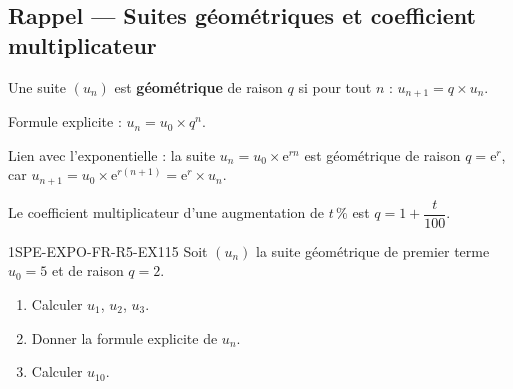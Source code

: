

\subsection*{Rappel — Suites géométriques et coefficient multiplicateur}

Une suite $(u_n)$ est \textbf{géométrique} de raison $q$ si pour tout $n$ : $u_{n+1} = q \times u_n$.

Formule explicite : $u_n = u_0 \times q^n$.

Lien avec l'exponentielle : la suite $u_n = u_0 \times \mathrm{e}^{rn}$ est géométrique de raison $q = \mathrm{e}^r$, car $u_{n+1} = u_0 \times \mathrm{e}^{r(n+1)} = \mathrm{e}^r \times u_n$.

Le coefficient multiplicateur d'une augmentation de $t\,\%$ est $q = 1 + \dfrac{t}{100}$.


\begin{exercice}{1SPE-EXPO-FR-R5-EX1}{1}{5}
Soit $(u_n)$ la suite géométrique de premier terme $u_0 = 5$ et de raison $q = 2$.
\begin{enumerate}
  \item Calculer $u_1$, $u_2$, $u_3$.
  \item Donner la formule explicite de $u_n$.
  \item Calculer $u_{10}$.
\end{enumerate}
\end{exercice}




